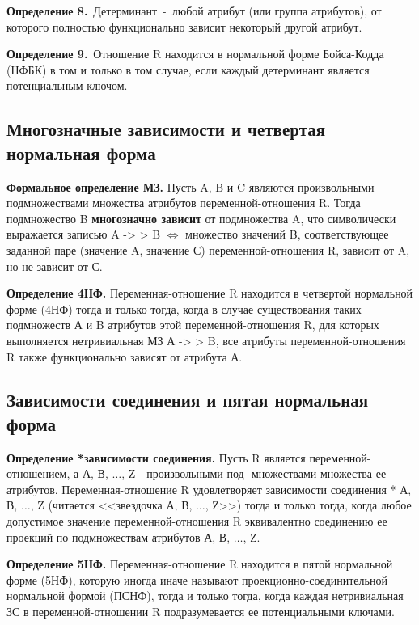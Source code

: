 \textbf{Определение 8.} Детерминант - любой атрибут (или группа атрибутов), от которого полностью функционально зависит некоторый другой атрибут.

\textbf{Определение 9.} Отношение R находится в нормальной форме Бойса-Кодда (НФБК) в том и только в том случае, если каждый детерминант является потенциальным ключом.

\subsection*{Многозначные зависимости и четвертая нормальная форма}

\textbf{Формальное определение МЗ.} 
Пусть A, B и C являются произвольными подмножествами множества атрибутов переменной-отношения R. 
Тогда подмножество B \textbf{многозначно зависит} от подмножества A, что символически выражается записью A -> > B $\Leftrightarrow$ множество значений B, соответствующее заданной паре (значение A, значение С) переменной-отношения R, зависит от A, но не зависит от С.

\textbf{Определение 4НФ.}  Переменная-отношение R находится в четвертой нормальной форме (4НФ) тогда и только тогда, когда в случае существования таких подмножеств А и B атрибутов этой переменной-отношения R, для которых выполняется нетривиальная МЗ А -> > B, все атрибуты переменной-отношения R также функционально зависят от атрибута А.

\subsection*{Зависимости соединения и пятая нормальная форма}

\textbf{Определение *зависимости соединения.} 
Пусть R является переменной-отношением, а А, В, $\ldots$, Z - произвольными под- множествами множества ее атрибутов. Переменная-отношение R удовлетворяет зависимости соединения *{ А, В, $\ldots$, Z} (читается <<звездочка А, В, $\ldots$, Z>>) тогда и только тогда, когда любое допустимое значение переменной-отношения R эквивалентно соединению ее проекций по подмножествам атрибутов А, В, $\ldots$, Z.

\textbf{Определение 5НФ.} Переменная-отношение R находится в пятой нормальной форме (5НФ), которую иногда иначе называют проекционно-соединительной нормальной формой (ПСНФ), тогда и только тогда, когда каждая нетривиальная ЗС в переменной-отношении R подразумевается ее потенциальными ключами.




